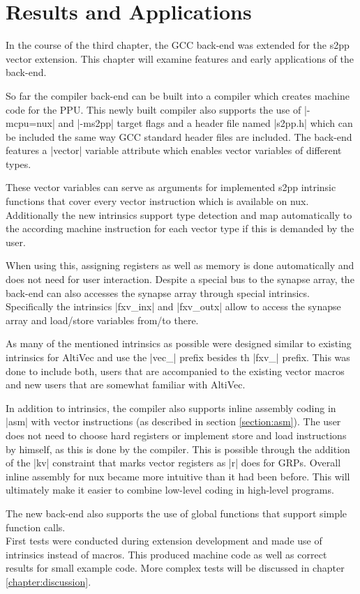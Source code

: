 \chapter{Results and Applications}
\label{ch:results}
In the course of the third chapter, the GCC back-end was extended for the s2pp vector extension.
This chapter will examine features and early applications of the back-end.

So far the compiler back-end can be built into a compiler which creates machine code for the PPU.
This newly built compiler also supports the use of |-mcpu=nux| and |-ms2pp| target flags and a header file named |s2pp.h| which can be included the same way GCC standard header files are included.
The back-end features a |vector| variable attribute which enables vector variables of different types.

These vector variables can serve as arguments for implemented s2pp intrinsic functions that cover every vector instruction which is available on nux.
Additionally the new intrinsics support type detection and map automatically to the according machine instruction for each vector type if this is demanded by the user.

When using this, assigning registers as well as memory is done automatically and does not need for user interaction.
Despite a special bus to the synapse array, the back-end can also accesses the synapse array through special intrinsics.
Specifically the intrinsics |fxv_inx| and |fxv_outx| allow to access the synapse array and load/store variables from/to there.

As many of the mentioned intrinsics as possible were designed similar to existing intrinsics for AltiVec and use the |vec_| prefix besides th |fxv_| prefix.
This was done to include both, users that are accompanied to the existing vector macros and new users that are somewhat familiar with AltiVec.

In addition to intrinsics, the compiler also supports inline assembly coding in |asm| with vector instructions (as described in section \ref{section:asm}).
The user does not need to choose hard registers or implement store and load instructions by himself, as this is done by the compiler.
This is possible through the addition of the |kv| constraint that marks vector registers as |r| does for GRPs.
Overall inline assembly for nux became more intuitive than it had been before.
This will ultimately make it easier to combine low-level coding in high-level programs.

The new back-end also supports the use of global functions that support simple function calls.
\\
First tests were conducted during extension development and made use of intrinsics instead of macros.
This produced machine code as well as correct results for small example code.
More complex tests will be discussed in chapter \ref{chapter:discussion}.

